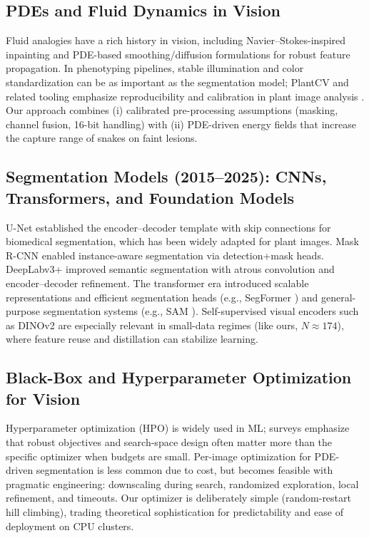 \documentclass[11pt,a4paper]{article}
\begin{document}
\subsection{PDEs and Fluid Dynamics in Vision}
Fluid analogies have a rich history in vision, including Navier--Stokes-inspired inpainting \citep{bertalmio2000navier} and PDE-based smoothing/diffusion formulations for robust feature propagation. In phenotyping pipelines, stable illumination and color standardization can be as important as the segmentation model; PlantCV and related tooling emphasize reproducibility and calibration in plant image analysis \citep{berry2018color,plantcv2025}. Our approach combines (i) calibrated pre-processing assumptions (masking, channel fusion, 16-bit handling) with (ii) PDE-driven energy fields that increase the capture range of snakes on faint lesions.

\subsection{Segmentation Models (2015--2025): CNNs, Transformers, and Foundation Models}
U-Net \citep{ronneberger2015u} established the encoder--decoder template with skip connections for biomedical segmentation, which has been widely adapted for plant images. Mask R-CNN \citep{he2017mask} enabled instance-aware segmentation via detection+mask heads. DeepLabv3+ \citep{chen2018deeplabv3plus} improved semantic segmentation with atrous convolution and encoder--decoder refinement. The transformer era introduced scalable representations and efficient segmentation heads (e.g., SegFormer \citep{xie2021segformer}) and general-purpose segmentation systems (e.g., SAM \citep{kirillov2023segment}). Self-supervised visual encoders such as DINOv2 \citep{oquab2023dinov2} are especially relevant in small-data regimes (like ours, $N\approx 174$), where feature reuse and distillation can stabilize learning.

\subsection{Black-Box and Hyperparameter Optimization for Vision}
Hyperparameter optimization (HPO) is widely used in ML; surveys \citep{yu2020hyperparam} emphasize that robust objectives and search-space design often matter more than the specific optimizer when budgets are small. Per-image optimization for PDE-driven segmentation is less common due to cost, but becomes feasible with pragmatic engineering: downscaling during search, randomized exploration, local refinement, and timeouts. Our optimizer is deliberately simple (random-restart hill climbing), trading theoretical sophistication for predictability and ease of deployment on CPU clusters.
\end{document}
